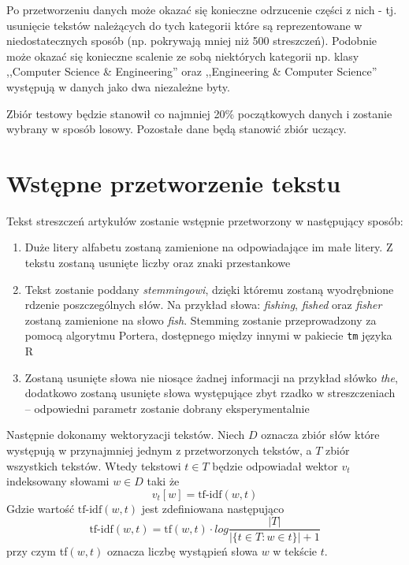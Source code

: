 \documentclass[a4paper,12pt]{article}
\begin{document}
	Po przetworzeniu danych może okazać się konieczne odrzucenie
	części z nich - tj. usunięcie tekstów należących do tych kategorii 
	które są reprezentowane w niedostatecznych sposób (np. pokrywają
	mniej niż 500 streszczeń). Podobnie może okazać się konieczne 
	scalenie ze sobą niektórych kategorii np. klasy ,,Computer Science \& Engineering'' oraz ,,Engineering \& Computer Science'' występują w danych jako dwa niezależne byty.
	
	Zbiór testowy będzie stanowił co najmniej 20\% 
	początkowych danych i zostanie
	wybrany w sposób losowy. 
	Pozostałe dane będą stanowić zbiór uczący.
	
	
\section{Wstępne przetworzenie tekstu}
	
	Tekst streszczeń artykułów zostanie wstępnie przetworzony
	w następujący sposób:
	\begin{enumerate}
		\item
			Duże litery alfabetu zostaną zamienione na odpowiadające im
			małe litery. Z tekstu zostaną usunięte liczby oraz
			znaki przestankowe	
		
		\item
			Tekst zostanie poddany \emph{stemmingowi},
			dzięki któremu zostaną
			wyodrębnione rdzenie poszczególnych słów. 
			Na przykład słowa:
			\textit{fishing}, \textit{fished} oraz \textit{fisher} 
			zostaną zamienione na słowo \textit{fish}.
			Stemming zostanie przeprowadzony za pomocą 
			algorytmu  Portera, dostępnego między innymi
			w pakiecie \texttt{tm} języka R
			
		\item
			Zostaną usunięte słowa nie niosące żadnej informacji
			na przykład słówko \textit{the}, dodatkowo zostaną 
			usunięte słowa występujące zbyt rzadko w streszczeniach --
			odpowiedni parametr zostanie dobrany eksperymentalnie 		
	\end{enumerate}
	
	Następnie dokonamy wektoryzacji tekstów. Niech $D$ oznacza 
	zbiór słów które występują w przynajmniej jednym z przetworzonych
	tekstów, a $T$ zbiór wszystkich tekstów. 
	Wtedy tekstowi $t \in T$ będzie odpowiadał wektor $v_t$
	indeksowany słowami $w \in D$ taki że 
	\[ v_t[w] = \textrm{tf-idf}(w, t) \]
	Gdzie wartość $\textrm{tf-idf}(w, t)$ jest zdefiniowana następująco
	\[ \textrm{tf-idf}(w, t) = \textrm{tf}(w, t) \cdot log{\frac{|T|}{|\{t \in T: w \in t \}| + 1}} \]
	przy czym tf$(w, t)$ oznacza liczbę wystąpień słowa $w$ w tekście $t$.
	
\end{document}
